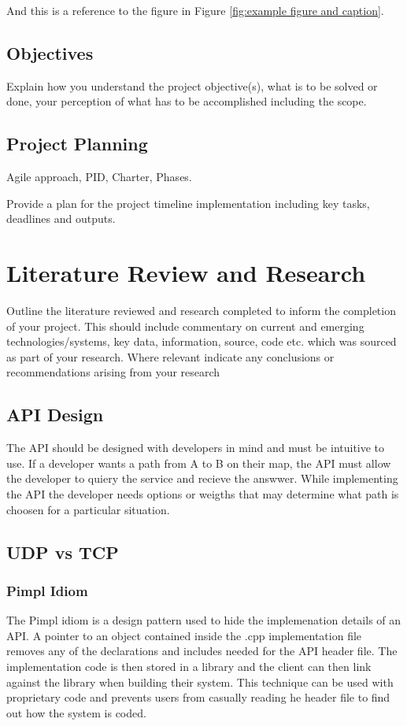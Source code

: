\documentclass[12pt,a4paper,titlepage]{article}
\begin{document}
And this is a reference to the figure in Figure \ref{fig:example figure and caption}.

\subsection{Objectives}
Explain how you understand the project objective(s), what is to be solved or done, your perception of what has to be accomplished including the scope. 

\subsection{Project Planning}
Agile approach, PID, Charter, Phases.

Provide a plan for the project timeline implementation including key tasks, deadlines and outputs.

\section{Literature Review and Research}
Outline the literature reviewed and research completed to inform the completion of your project.  This should include commentary on current and emerging technologies/systems, key data, information, source, code etc. which was sourced as part of your research.  Where relevant indicate any conclusions or recommendations arising from your research

\subsection{API Design}

The API should be designed with developers in mind and must be intuitive to use. If a developer wants a path from A to B on their map, the API must allow the developer to quiery the service and recieve the answwer. While implementing the API the developer needs options or weigths that may determine what path is choosen for a particular situation. 

\subsection{UDP vs TCP}

\subsubsection{Pimpl Idiom}

The Pimpl idiom is a design pattern used to hide the implemenation details of an API. A pointer to an object contained inside the .cpp implementation file removes any of the declarations and includes needed for the API header file. The implementation code is then stored in a library and the client can then link against the library when building their system. This technique can be used with proprietary code and prevents users from casually reading he header file to find out how the system is coded. 
\end{document}
